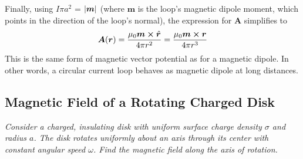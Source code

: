 \documentclass[11pt, a4paper]{article}
\renewcommand{\vec}[1]{\bm{#1}} %
\newcommand{\uvec}[1]{\hat{\vec{#1}}} %
\renewcommand{\r}{\vec{r}}
\newcommand{\A}{\vec{A}}  %
\newcommand{\m}{\vec{m}}  %
\begin{document}
\begin{itemize}
	
	Finally, using $ I \pi a^{2} $ = $ \abs{\vec{m}} $ (where $ \m $ is the loop's magnetic dipole moment, which points in the direction of the loop's normal), the expression for $ \A $ simplifies to
	\begin{equation*}
		\A(\r) = \frac{\mu_{0} \m \cross \uvec{r}}{4\pi r^{2}} = \frac{\mu_{0} \m \cross \r}{4\pi r^{3}}
	\end{equation*}
	This is the same form of magnetic vector potential as for a magnetic dipole. In other words, a circular current loop behaves as magnetic dipole at long distances.
	
\end{itemize}

\subsection{Magnetic Field of a Rotating Charged Disk}
\textit{Consider a charged, insulating disk with uniform surface charge density $ \sigma $ and radius $ a $. The disk rotates uniformly about an axis through its center with constant angular speed $ \omega $. Find the magnetic field along the axis of rotation.}
\end{document}
